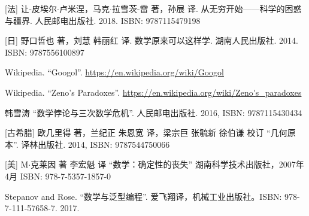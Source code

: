 \documentclass{article}
\begin{document}
\ifx\wholebook\relax \else
\begin{thebibliography}{99}

[法] 让-皮埃尔$\cdot$卢米涅，马克$\cdot$拉雪茨-雷 著，孙展 译. 从无穷开始——科学的困惑与疆界. 人民邮电出版社. 2018. ISBN: 9787115479198

[日] 野口哲也 著，刘慧 韩丽红 译. 数学原来可以这样学. 湖南人民出版社. 2014. ISBN: 9787556100897

Wikipedia. ``Googol''. \url{https://en.wikipedia.org/wiki/Googol}

Wikipedia. ``Zeno's Paradoxes''. \url{https://en.wikipedia.org/wiki/Zeno's_paradoxes}

韩雪涛 ``数学悖论与三次数学危机''. 人民邮电出版社. 2016, ISBN: 9787115430434

[古希腊] 欧几里得 著，兰纪正 朱恩宽 译，梁宗巨 张毓新 徐伯谦 校订 ``几何原本''. 译林出版社. 2014, ISBN: 9787544750066

[美] M$\cdot$克莱因 著 李宏魁 译 ``数学：确定性的丧失'' 湖南科学技术出版社，2007年4月 ISBN: 978-7-5357-1857-0

Stepanov and Rose. ``数学与泛型编程''. 爱飞翔译，机械工业出版社。ISBN: 978-7-111-57658-7. 2017.

\end{thebibliography}

\expandafter\enddocument

\fi
\end{document}
